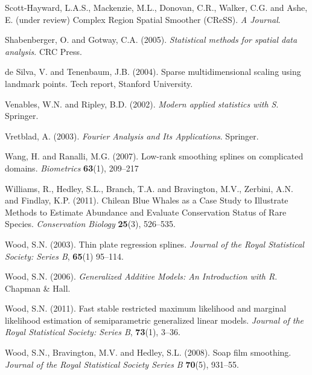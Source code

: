 \documentclass[useAMS, referee]{biom}
\begin{document}
\begin{thebibliography}{99}
\bibitem{} Scott-Hayward, L.A.S., Mackenzie, M.L., Donovan, C.R., Walker, C.G. and Ashe, E. (under review) Complex Region Spatial Smoother (CReSS). \textit{A Journal}.

\bibitem{} Shabenberger, O. and Gotway, C.A. (2005). \textit{Statistical methods for spatial data analysis}. CRC Press.

\bibitem{} de Silva, V. and Tenenbaum, J.B. (2004). Sparse multidimensional scaling using landmark points. Tech report, Stanford University.

\bibitem{} Venables, W.N. and Ripley, B.D. (2002). \textit{Modern applied statistics with S}. Springer.

\bibitem{} Vretblad, A. (2003). \textit{Fourier Analysis and Its Applications}. Springer.

\bibitem{} Wang, H. and Ranalli, M.G. (2007). Low-rank smoothing splines on complicated domains. \textit{Biometrics} \textbf{63}(1), 209--217

\bibitem{} Williams, R., Hedley, S.L., Branch, T.A. and Bravington, M.V., Zerbini, A.N. and Findlay, K.P. (2011). Chilean Blue Whales as a Case Study to Illustrate Methods to Estimate Abundance and Evaluate Conservation Status of Rare Species. \textit{Conservation Biology} \textbf{25}(3), 526--535.

\bibitem{} Wood, S.N. (2003). Thin plate regression splines. \textit{Journal of the Royal Statistical Society: Series B}, \textbf{65}(1) 95--114.

\bibitem{} Wood, S.N. (2006). \textit{Generalized Additive Models: An Introduction with R}. Chapman \& Hall.

\bibitem{} Wood, S.N. (2011). Fast stable restricted maximum likelihood and marginal likelihood estimation of semiparametric generalized linear models. \textit{Journal of the Royal Statistical Society: Series B}, \textbf{73}(1), 3--36.

\bibitem{} Wood, S.N., Bravington, M.V. and Hedley, S.L. (2008). Soap film smoothing. \textit{Journal of the Royal Statistical Society Series B} \textbf{70}(5), 931--55.

\end{thebibliography}


\label{lastpage}
\end{document}
